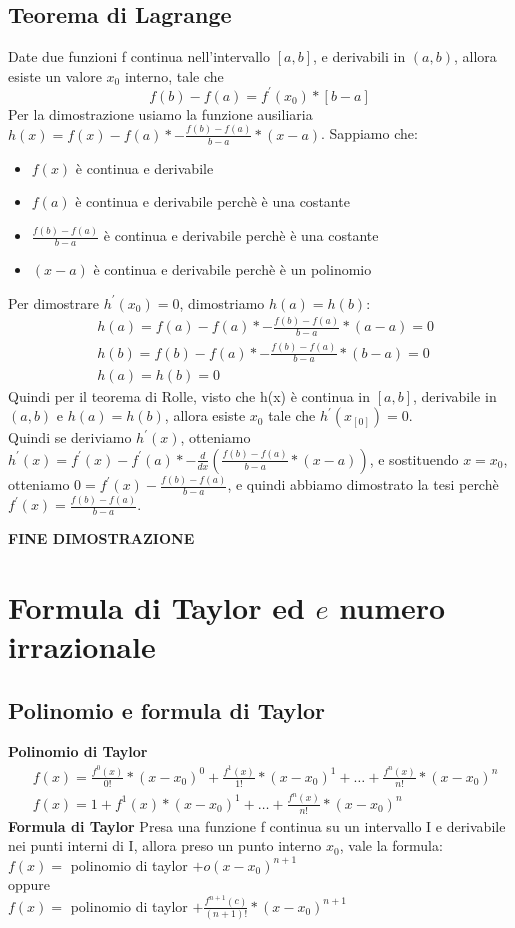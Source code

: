 \documentclass[11pt]{article}
\begin{document}
\subsection{Teorema di Lagrange}
Date due funzioni f continua nell'intervallo $[a,b]$, e derivabili in $(a,b)$, allora esiste un valore $x_{0}$ interno, tale che $$f(b)-f(a) = f^{'}(x_{0})*[b-a]$$
Per la dimostrazione usiamo la funzione ausiliaria $h(x) = f(x) - f(a)*-\frac{f(b)-f(a)}{b-a}*(x-a)$. Sappiamo che:\\
\begin{itemize}
    \item $f(x)$ è continua e derivabile
    \item $f(a)$ è continua e derivabile perchè è una costante
    \item $\frac{f(b)-f(a)}{b-a}$ è continua e derivabile perchè è una costante
    \item $(x-a)$ è continua e derivabile perchè è un polinomio
\end{itemize}
Per dimostrare $h^{'}(x_{0}) = 0$, dimostriamo $h(a) = h(b)$:\\
\begin{align*}
    &h(a) = f(a) - f(a)*-\frac{f(b)-f(a)}{b-a}*(a-a) = 0\\
    &h(b) = f(b) - f(a)*-\frac{f(b)-f(a)}{b-a}*(b-a) = 0\\
    &h(a) = h(b) = 0
\end{align*}
Quindi per il teorema di Rolle, visto che h(x) è continua in $[a,b]$, derivabile in $(a,b)$ e $h(a) = h(b)$, allora esiste $x_{0}$ tale che $h^{'}(x_[0]) = 0$.\\
Quindi se deriviamo $h^{'}(x)$, otteniamo $h^{'}(x) = f^{'}(x) - f^{'}(a)*-\frac{d}{dx}(\frac{f(b)-f(a)}{b-a}*(x-a))$, e sostituendo $x = x_{0}$, otteniamo $0 = f^{'}(x) -\frac{f(b)-f(a)}{b-a}$, 
e quindi abbiamo dimostrato la tesi perchè $f^{'}(x) = \frac{f(b)-f(a)}{b-a}$.\\
\begin{center}
    \textbf{FINE DIMOSTRAZIONE}
\end{center}
\section{Formula di Taylor ed $e$ numero irrazionale}
\subsection{Polinomio e formula di Taylor}
\textbf{Polinomio di Taylor}
\begin{align*}
    &f(x) = \frac{f^{0}(x)}{0!}*(x-x_{0})^{0} + \frac{f^{1}(x)}{1!}*(x-x_{0})^{1} + \dots + \frac{f^{n}(x)}{n!}*(x-x_{0})^{n}\\
    &f(x) = 1 + f^{1}(x)*(x-x_{0})^{1} + \dots + \frac{f^{n}(x)}{n!}*(x-x_{0})^{n}
\end{align*}
\textbf{Formula di Taylor}
Presa una funzione f continua su un intervallo I e derivabile nei punti interni di I, allora preso un punto interno $x_{0}$, vale la formula:\\
$f(x) = $ polinomio di taylor $+ o(x-x_{0})^{n+1}$\\
oppure\\
$f(x) = $ polinomio di taylor $+ \frac{f^{n+1}(c)}{(n+1)!}*(x-x_{0})^{n+1}$\\
\end{document}
